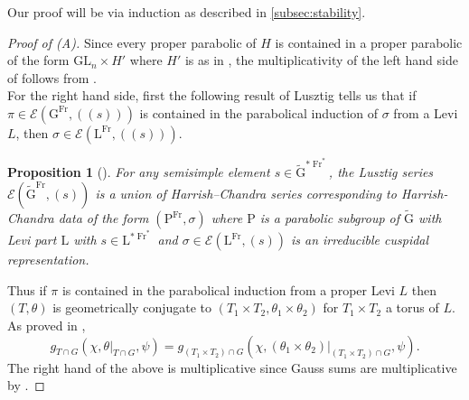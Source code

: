 \documentclass[12pt, reqno]{amsart}
\newtheorem{proposition}[theorem]{Proposition}
\theoremstyle{definition}
\theoremstyle{definition}
\theoremstyle{definition}
\newcommand{\GL}{\mathrm{GL}}
\newcommand{\GroupExtension}[1]{\widetilde{#1}}
\newcommand{\Frobenius}{\operatorname{Fr}}
\newcommand{\algebraicGroup}[1]{\boldsymbol{\mathrm{#1}}}
\newcommand{\LusztigSeries}[2]{\mathcal{E}\left(#1, (#2)\right)}
\newcommand{\DualFrobeniusFixedPoints}[2][\Frobenius^{\ast}]{\algebraicGroup{#2}^{\ast #1}}
\newcommand{\FrobeniusFixedPoints}[2][\Frobenius]{\algebraicGroup{#2}^{#1}}
\begin{document}
Our proof will be via induction as described in \ref{subsec:stability}.
\begin{proof}[Proof of (A)]
	Since every proper parabolic of $H$ is contained in a proper parabolic of the form $\algebraicGroup{\GL}_n \times H'$ where $H'$ is as in , the multiplicativity of the left hand side of  follows from . \\
	For the right hand side, first the following result of Lusztig tells us that if $\pi \in \LusztigSeries{
		\algebraicGroup{G}^{\Frobenius}}{(s)}$ is contained in the parabolical induction of $\sigma$ from a Levi $L$, then $\sigma \in \LusztigSeries{
		\algebraicGroup{L}^{\Frobenius}}{(s)}$.
		\begin{proposition}[{\cite[Proof of Corollary 3.3.21]{GeckMalle2020}}]
			For any semisimple element $s \in \DualFrobeniusFixedPoints{\GroupExtension{G}}$, the Lusztig series $\LusztigSeries{\FrobeniusFixedPoints{\GroupExtension{G}}}{s}$ is a union of Harrish--Chandra series corresponding to Harrish-Chandra data of the form $\left(\FrobeniusFixedPoints{\algebraicGroup{P}},\sigma\right)$ where $\algebraicGroup{P}$ is a parabolic subgroup of $\algebraicGroup{\GroupExtension{G}}$ with Levi part $\algebraicGroup{L}$ with $s \in \DualFrobeniusFixedPoints{L}$ and $\sigma \in \LusztigSeries{\FrobeniusFixedPoints{L}}{s}$ is an irreducible cuspidal representation.
		\end{proposition}
	Thus if $\pi$ is contained in the parabolical induction from a proper Levi $L$ then $(T,\theta)$ is geometrically conjugate to $(T_1 \times T_2,\theta_1 \times \theta_2)$ for $T_1 \times T_2$ a torus of $L$. As proved in , $$g_{T \cap G}(\chi,\theta|_{T \cap G},\psi) = g_{(T_1 \times T_2) \cap G}(\chi,\left(\theta_1\times \theta_2\right)|_{(T_1 \times T_2) \cap G},\psi).$$ The right hand of the above is multiplicative since Gauss sums are multiplicative by .
\end{proof}
\end{document}
